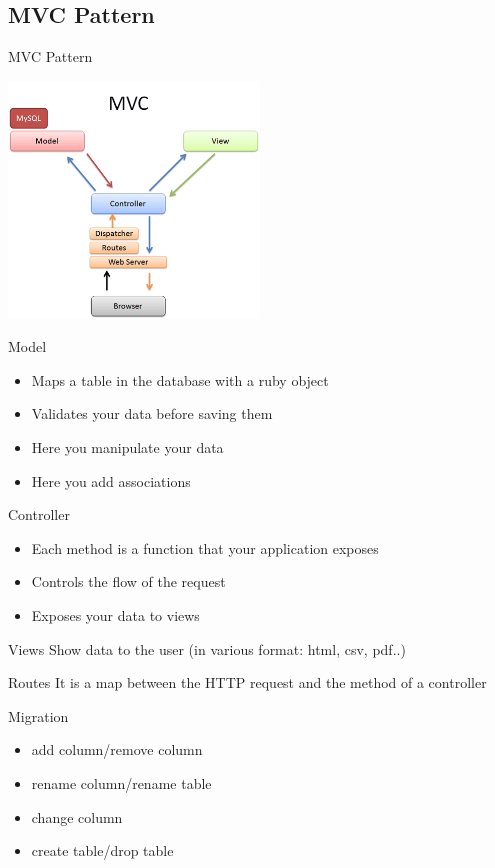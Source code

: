 \documentclass[xcolor=svgnames]{beamer}
\begin{document}
\subsection{MVC Pattern}
\begin{frame}{MVC Pattern}
\transwipe
  \begin{center}
  \includegraphics[width=0.5\textwidth]{rails-mvc.png}
  \end{center}
\end{frame}

\begin{frame}{Model}
\transwipe
  \begin{itemize}
   \item \alert<+>{Maps a table in the database with a ruby object}
 \item \alert<+>{Validates your data before saving them}
 \item \alert<+>{Here you manipulate your data}
 \item \alert<+>{Here you add associations}	
  \end{itemize}
\end{frame}
\begin{frame}{Controller}
\transwipe
	\begin{itemize}
	 \item \alert<+>{Each method is a function that your application exposes}
	 \item \alert<+>{Controls the flow of the request}
	 \item \alert<+>{Exposes your data to views}
	\end{itemize}
\end{frame}
\begin{frame}{Views}
  Show data to the user (in various format: html, csv, pdf..)
\end{frame}

\begin{frame}{Routes}
It is a map between the HTTP request and the method of a controller
\end{frame}
\begin{frame}{Migration}
  \begin{itemize}
    \item {add column/remove column}
	   \item {rename column/rename table}
	   \item {change column}
	   \item {create table/drop table}
  \end{itemize}
	
\end{frame}
\end{document}
